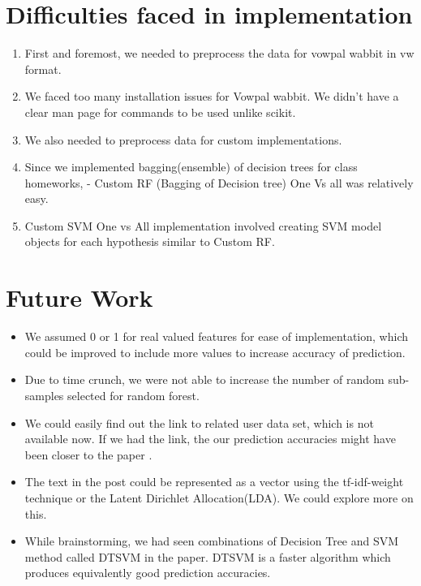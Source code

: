 \documentclass[letterpaper,twocolumn,11pt]{article}
\begin{document}
\section{Difficulties faced in implementation}
\begin{enumerate}
\itemsep0em
\item First and foremost, we needed to preprocess the data for vowpal wabbit in vw format.
\item We faced too many installation issues for Vowpal wabbit. We didn't have a clear man page for commands to be used unlike scikit.
\item We also needed to preprocess data for custom implementations.
\item Since we implemented bagging(ensemble) of decision trees for class homeworks, - Custom RF (Bagging of Decision tree) One Vs all was relatively easy.
\item Custom SVM One vs All implementation involved creating SVM model objects for each hypothesis similar to Custom RF.
\end{enumerate}


\section{Future Work}

\begin{itemize}
\itemsep0em
\item We assumed 0 or 1 for real valued features for ease of implementation, which could be improved to include more values to increase accuracy of prediction.
\item Due to time crunch, we were not able to increase the number of random sub-samples selected for random forest.
\item We could easily find out the link to related user data set, which is not available now. If we had the link, the our prediction accuracies might have been closer to the paper \cite{Lezina_predictclosed}.
\item  The text in the post could be represented as a vector using the tf-idf-weight technique or the Latent  Dirichlet Allocation(LDA). We could explore more on this.
\item While brainstorming, we had seen combinations of Decision Tree and SVM method called DTSVM in the paper\cite{5695459}. DTSVM is a faster algorithm which produces equivalently good prediction accuracies.
\end{itemize}
\end{document}
